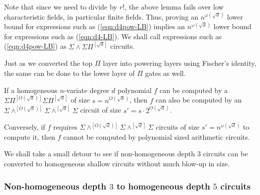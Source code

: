 \documentclass{beatcs}
\newcommand{\SPSPfanin}[2]{\Sigma\Pi^{[#1]}\Sigma\Pi^{[#2]}}
\begin{document}
Note that since we need to divide by $r!$, the above lemma fails over low characteristic fields, in particular finite fields. Thus, proving an $n^{\omega(\sqrt{d})}$ lower bound for expressions such as (\ref{eqn:d4pow-LB}) implies an $n^{\omega(\sqrt{d})}$ lower bound for expressions such as (\ref{eqn:d4-LB}). We shall call expressions such as (\ref{eqn:d4pow-LB}) as $\Sigma\!\wedge\!\Sigma\Pi^{[\sqrt{d}]}$ circuits. 

Just as we converted the top $\Pi$ layer into powering layers using Fischer's identity, the same can be done to the lower layer of $\Pi$ gates as well.

\begin{corollary}\label{cor:pow-genckt}
If a homogeneous $n$-variate degree $d$ polynomial $f$ can be computed by a $\SPSPfanin{O(\sqrt{d})}{\sqrt{d}}$ of size $s = n^{O(\sqrt{d})}$, then $f$ can also be computed by an $\Sigma\!\wedge^{[O(\sqrt{d})]}\!\Sigma\!\wedge^{[\sqrt{d}]}\!\Sigma$ circuit of size $s' = s \cdot 2^{O(\sqrt{d})}$. 

Conversely, if $f$ requires $\Sigma\!\wedge^{[O(\sqrt{d})]}\!\Sigma\!\wedge^{[\sqrt{d}]}\!\Sigma$ circuits of size $s' = n^{\omega(\sqrt{d})}$ to compute it, then $f$ cannot be computed by polynomial sized arithmetic circuits. 
\end{corollary}

We shall take a small detour to see if non-homogeneous depth $3$ circuits can be converted to homogeneous shallow circuits without much blow-up in size.

\subsubsection{Non-homogeneous depth $3$ to homogeneous depth $5$ circuits}
\end{document}
